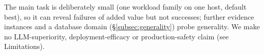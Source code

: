 The main task is deliberately small (one workload family on one host, default best), so it can reveal failures of added value but not successes; further evidence instances and a database domain (\S\ref{subsec:generality}) probe generality. We make no LLM-superiority, deployment-efficacy or production-safety claim (see Limitations).
